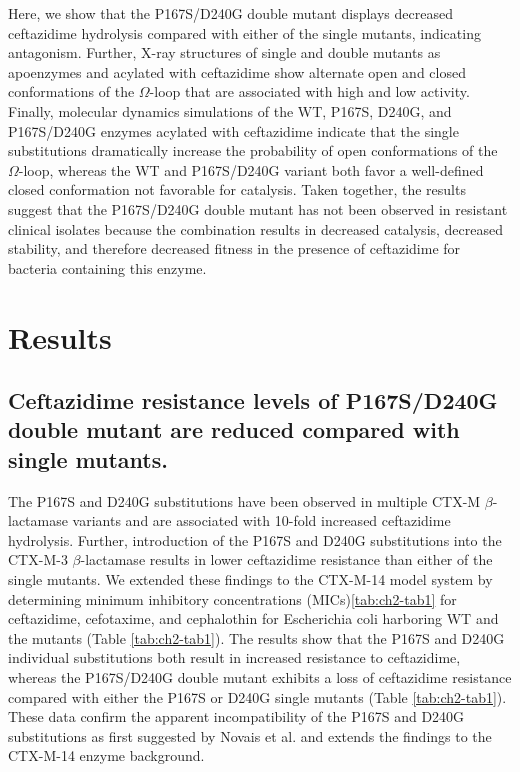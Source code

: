 \documentclass[../main.tex]{subfiles}
\begin{document}
        Here, we show that the P167S/D240G double mutant displays decreased ceftazidime hydrolysis compared with either of the single mutants, indicating antagonism. Further, X-ray structures of single and double mutants as apoenzymes and acylated with ceftazidime show alternate open and closed conformations of the $\Omega$-loop that are associated with high and low activity. Finally, molecular dynamics simulations of the WT, P167S, D240G, and P167S/D240G enzymes acylated with ceftazidime indicate that the single substitutions dramatically increase the probability of open conformations of the $\Omega$-loop, whereas the WT and P167S/D240G variant both favor a well-defined closed conformation not favorable for catalysis. Taken together, the results suggest that the P167S/D240G double mutant has not been observed in resistant clinical isolates because the combination results in decreased catalysis, decreased stability, and therefore decreased fitness in the presence of ceftazidime for bacteria containing this enzyme.

    
    \section{Results}
    \subsection{Ceftazidime resistance levels of P167S/D240G double mutant are reduced compared with single mutants.}

        The P167S and D240G substitutions have been observed in multiple CTX-M $\beta$-lactamase variants and are associated with 10-fold increased ceftazidime hydrolysis\cite{chen_atomic_2005,patel_characterization_2015}. Further, introduction of the P167S and D240G substitutions into the CTX-M-3 $\beta$-lactamase results in lower ceftazidime resistance than either of the single mutants\cite{novais_mutational_2008}. We extended these findings to the CTX-M-14 model system by determining minimum inhibitory concentrations (MICs)\ref{tab:ch2-tab1} for ceftazidime, cefotaxime, and cephalothin for Escherichia coli harboring WT and the mutants (Table \ref{tab:ch2-tab1}). The results show that the P167S and D240G individual substitutions both result in increased resistance to ceftazidime, whereas the P167S/D240G double mutant exhibits a loss of ceftazidime resistance compared with either the P167S or D240G single mutants (Table \ref{tab:ch2-tab1})\cite{patel_characterization_2015,novais_mutational_2008}. These data confirm the apparent incompatibility of the P167S and D240G substitutions as first suggested by Novais et al. \cite{novais_mutational_2008} and extends the findings to the CTX-M-14 enzyme background.
\end{document}
